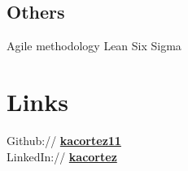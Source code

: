 \documentclass[]{deedy-resume-openfont}
\begin{document}
\begin{minipage}[t]{0.33\textwidth}
\subsection{Others}
Agile methodology 
\textbullet{} Lean Six Sigma 
\sectionsep


\section{Links} 
Github:// \href{https://github.com/kacortez11}{\bf kacortez11} \\
LinkedIn://  \href{https://www.linkedin.com/in/kacortez}{\bf kacortez} \\




%
%

\end{minipage} 
\end{document}
